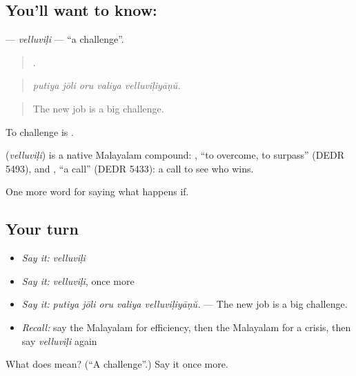 \subsection*{You'll want to know: }
\textbf{} — \emph{velluviḷi} — \textquotedblleft{}a challenge\textquotedblright{}.

\begin{quote}
    .
\end{quote}

\begin{quote}
\emph{putiya jōli oru valiya velluviḷiyāṇŭ.}
\end{quote}

\begin{quote}
The new job is a big challenge.
\end{quote}

To challenge is .

\begin{cousinweb}
\textbf{} (\emph{velluviḷi}) is a native Malayalam compound: , \textquotedblleft{}to overcome, to surpass\textquotedblright{} (DEDR 5493), and , \textquotedblleft{}a call\textquotedblright{} (DEDR 5433): a call to see who wins.
\end{cousinweb}

\begin{grammarlens}[title={What you've built}]
One more word for saying what happens if.
\end{grammarlens}

\subsection*{Your turn}
\begin{itemize}
\raggedright
  \item \emph{Say it:} \emph{velluviḷi}
  \item \emph{Say it:} \emph{velluviḷi}, once more
  \item \emph{Say it:} \emph{putiya jōli oru valiya velluviḷiyāṇŭ.} — The new job is a big challenge.
  \item \emph{Recall:} say the Malayalam for efficiency, then the Malayalam for a crisis, then say \emph{velluviḷi} again
\end{itemize}

\begin{tcolorbox}[breakable,colback=teal!4,colframe=teal!35!black,title={Before you move on}]
What does  mean? (\textquotedblleft{}A challenge\textquotedblright{}.) Say it once more.
\end{tcolorbox}

